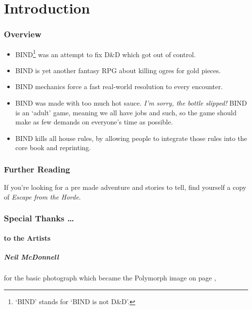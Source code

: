 \chapter*{Introduction}

\begin{multicols}{2}

\subsection*{Overview}

\begin{itemize}

  \item
  BIND\footnote{`BIND' stands for `BIND is not D\&D'.} was an attempt to fix D\&D which got out of control.
  \item
  BIND is yet another fantasy RPG about killing ogres for gold pieces.
  \item
  BIND mechanics force a fast real-world resolution to every encounter.
  \item
  \ifnum{}
    BIND was made with too much hot sauce.
    \emph{I'm sorry, the bottle slipped!}
  \else
  BIND is an `adult' game, meaning we all have jobs and such, so the game should make as few demands on everyone's time as possible.
  \fi
  \item
  BIND kills all house rules, by allowing people to integrate those rules into the core book and reprinting.

\end{itemize}


\subsection*{Further Reading}

If you're looking for a pre made adventure and stories to tell, find yourself a copy of \textit{Escape from the Horde}.

\subsection*{Special Thanks \ldots}

\subsubsection*{to the Artists}

\paragraph{Neil McDonnell} for the basic photograph which became the Polymorph image on page \pageref{Roch_Hercka/polymorph},


\end{multicols}
